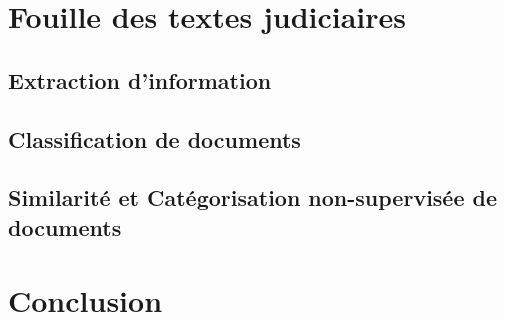 




\section{Fouille des textes judiciaires}
\label{sec:literature:legaltal}



\subsection{Extraction d'information}
\subsection{Classification de documents}

\subsection{Similarité et Catégorisation non-supervisée de documents}
\section{Conclusion}
\label{sec:literature:conclusion}
